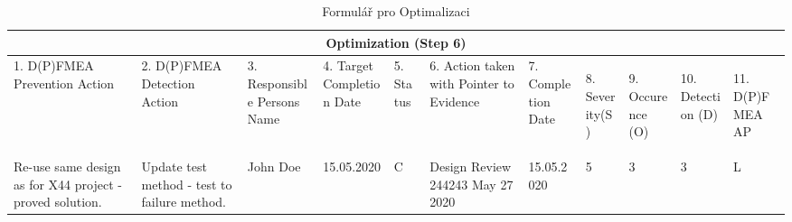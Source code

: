 \begin{landscape}
\begin{table}[h]
	\centering
	\caption{Formulář pro Optimalizaci }
	\label{tab:optimization_FMEA}
\begin{tabular}{|p{2.5cm}|p{2.5cm}|p{2.5cm}|p{2.5cm}|p{1.5cm}|p{2.5cm}|p{2.5cm}|p{0.5cm}|p{0.5cm}|p{0.5cm}|p{0.5cm}| }
 \hline
 \multicolumn{11}{|c|}{Optimization (Step 6)} \\
 \hline
1. D(P)FMEA Prevention Action &
2. D(P)FMEA Detection Action &
3. Responsible Persons Name &
4. Target Completion Date &
5. Status &
6. Action taken with Pointer to Evidence &
7. Completion Date &

\begin{turn}{-90}8. Severity(S)\end{turn} &
\begin{turn}{-90}9. Occurence (O)\end{turn} &
\begin{turn}{-90}10. Detection (D)\end{turn} &
\begin{turn}{-90}11. D(P)FMEA AP\end{turn}

\\
 \hline
Re-use same design as for X44 project - proved solution. &
Update test method - test to failure method.& 
John Doe & 
15.05.2020 &
C & 
Design Review 244243 May 27 2020 & 
15.05.2020 & 
5 & 
3 & 
3 & 
L 

\\
 \hline
\end{tabular}\  
\end{table}
\end{landscape}

